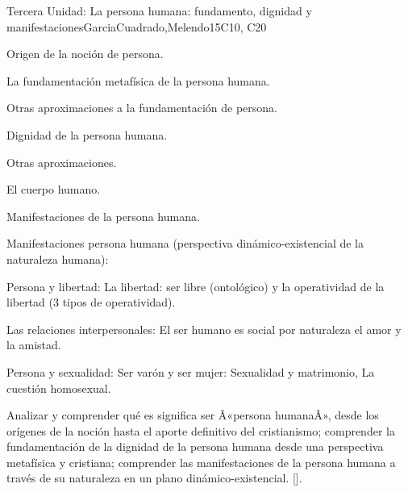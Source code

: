 \begin{syllabus}
\begin{unit}{}{Tercera Unidad: La persona humana: fundamento, dignidad y manifestaciones}{GarciaCuadrado,Melendo}{15}{C10, C20}
\begin{topics}
	\item Origen de la noción de persona.
	\item La fundamentación metafísica de la persona humana.
	\item Otras aproximaciones a la fundamentación de persona.
	\item Dignidad de la persona humana.
		\begin{subtopics}
			\item Otras aproximaciones.
		\end{subtopics}
	\item El cuerpo humano.
	\item Manifestaciones de la persona humana.
	\item Manifestaciones persona humana (perspectiva dinámico-existencial de la naturaleza humana):
		\begin{subtopics}
			\item Persona y libertad:  La libertad: ser libre (ontológico) y la operatividad de la libertad (3 tipos de operatividad).
			\item Las relaciones interpersonales: El ser humano es social por naturaleza el amor y la amistad.
			\item Persona y sexualidad: Ser varón y ser mujer: Sexualidad y matrimonio, La cuestión homosexual.
		\end{subtopics}
\end{topics}
\begin{learningoutcomes}
	\item Analizar y comprender qué es significa ser Â«persona humanaÂ», desde los orígenes de la noción hasta el aporte definitivo del cristianismo; comprender la fundamentación de la dignidad de la persona humana desde una perspectiva metafísica y cristiana; comprender las manifestaciones de la persona humana a través de su naturaleza en un plano dinámico-existencial. [\Usage].
\end{learningoutcomes}
\end{unit}


\end{syllabus}
